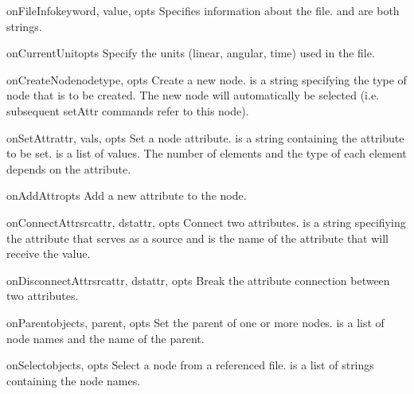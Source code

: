 \begin{methoddesc}{onFileInfo}{keyword, value, opts}
Specifies information about the file.  and 
are both strings.
\end{methoddesc}

\begin{methoddesc}{onCurrentUnit}{opts}
Specify the units (linear, angular, time) used in the file.
\end{methoddesc}

\begin{methoddesc}{onCreateNode}{nodetype, opts}
Create a new node.  is a string specifying the type of node
that is to be created. The new node will automatically be selected (i.e.
subsequent setAttr commands refer to this node).
\end{methoddesc}

\begin{methoddesc}{onSetAttr}{attr, vals, opts}
Set a node attribute.  is a string containing the attribute
to be set.  is a list of values. The number of elements and
the type of each element depends on the attribute.
\end{methoddesc}

\begin{methoddesc}{onAddAttr}{opts}
Add a new attribute to the node.
\end{methoddesc}

\begin{methoddesc}{onConnectAttr}{srcattr, dstattr, opts}
Connect two attributes.  is a string specifiying the
attribute that serves as a source and  is the name of
the attribute that will receive the value. 
\end{methoddesc}

\begin{methoddesc}{onDisconnectAttr}{srcattr, dstattr, opts}
Break the attribute connection between two attributes.
\end{methoddesc}

\begin{methoddesc}{onParent}{objects, parent, opts}
Set the parent of one or more nodes.  is a list of node names
and  the name of the parent.
\end{methoddesc}

\begin{methoddesc}{onSelect}{objects, opts}
Select a node from a referenced file.  is a list of strings
containing the node names.
\end{methoddesc}

